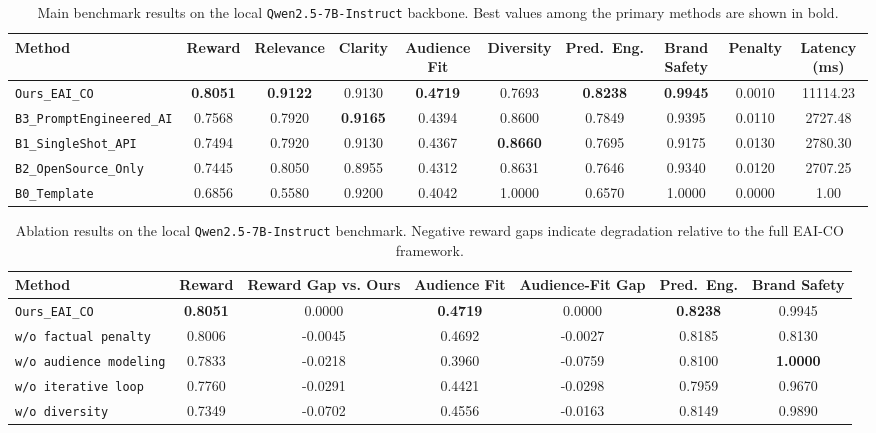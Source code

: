 \begin{table}[t]
\centering
\caption{Main benchmark results on the local \texttt{Qwen2.5-7B-Instruct} backbone. Best values among the primary methods are shown in bold.}
\label{tab:qwen_main_results}
\begin{adjustbox}{max width=\textwidth}
\begin{tabular}{lccccccccc}
\toprule
Method & Reward & Relevance & Clarity & Audience Fit & Diversity & Pred.\ Eng. & Brand Safety & Penalty & Latency (ms) \\
\midrule
\texttt{Ours\_EAI\_CO} & \textbf{0.8051} & \textbf{0.9122} & 0.9130 & \textbf{0.4719} & 0.7693 & \textbf{0.8238} & \textbf{0.9945} & 0.0010 & 11114.23 \\
\texttt{B3\_PromptEngineered\_AI} & 0.7568 & 0.7920 & \textbf{0.9165} & 0.4394 & 0.8600 & 0.7849 & 0.9395 & 0.0110 & 2727.48 \\
\texttt{B1\_SingleShot\_API} & 0.7494 & 0.7920 & 0.9130 & 0.4367 & \textbf{0.8660} & 0.7695 & 0.9175 & 0.0130 & 2780.30 \\
\texttt{B2\_OpenSource\_Only} & 0.7445 & 0.8050 & 0.8955 & 0.4312 & 0.8631 & 0.7646 & 0.9340 & 0.0120 & 2707.25 \\
\texttt{B0\_Template} & 0.6856 & 0.5580 & 0.9200 & 0.4042 & 1.0000 & 0.6570 & 1.0000 & 0.0000 & 1.00 \\
\bottomrule
\end{tabular}
\end{adjustbox}
\end{table}

\begin{table}[t]
\centering
\caption{Ablation results on the local \texttt{Qwen2.5-7B-Instruct} benchmark. Negative reward gaps indicate degradation relative to the full EAI-CO framework.}
\label{tab:qwen_ablation}
\begin{adjustbox}{max width=\textwidth}
\begin{tabular}{lcccccc}
\toprule
Method & Reward & Reward Gap vs. Ours & Audience Fit & Audience-Fit Gap & Pred.\ Eng. & Brand Safety \\
\midrule
\texttt{Ours\_EAI\_CO} & \textbf{0.8051} & 0.0000 & \textbf{0.4719} & 0.0000 & \textbf{0.8238} & 0.9945 \\
\texttt{w/o factual penalty} & 0.8006 & -0.0045 & 0.4692 & -0.0027 & 0.8185 & 0.8130 \\
\texttt{w/o audience modeling} & 0.7833 & -0.0218 & 0.3960 & -0.0759 & 0.8100 & \textbf{1.0000} \\
\texttt{w/o iterative loop} & 0.7760 & -0.0291 & 0.4421 & -0.0298 & 0.7959 & 0.9670 \\
\texttt{w/o diversity} & 0.7349 & -0.0702 & 0.4556 & -0.0163 & 0.8149 & 0.9890 \\
\bottomrule
\end{tabular}
\end{adjustbox}
\end{table}


